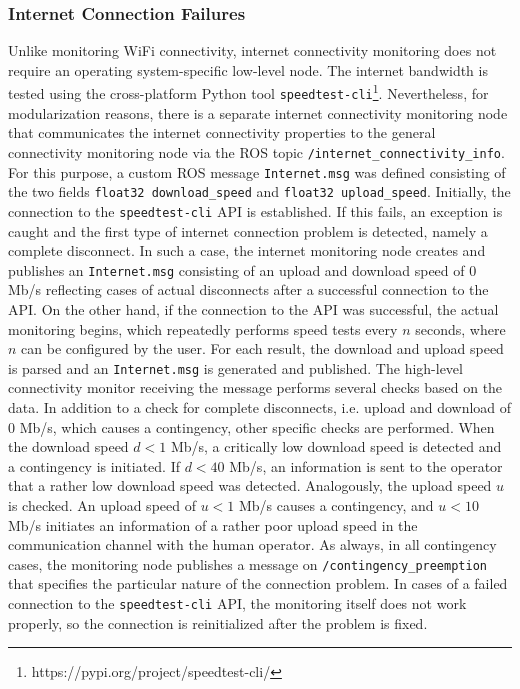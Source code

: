 \documentclass[english, master, utf8]{base/thesis_KBS}
\newcommand{\code}[1]{\colorbox{light-gray}{\texttt{#1}}}
\begin{document}
\subsubsection{Internet Connection Failures}
\label{sec:sim_and_mon_internet_connection_problems}

Unlike monitoring WiFi connectivity, internet connectivity monitoring does not require an operating system-specific low-level node. The internet bandwidth is tested using the
cross-platform Python tool \code{speedtest-cli}\footnote{https://pypi.org/project/speedtest-cli/}. Nevertheless, for modularization reasons, there is a separate internet
connectivity monitoring node that communicates the internet connectivity properties to the general connectivity monitoring node via the ROS topic \code{/internet\_connectivity\_info}.
For this purpose, a custom ROS message \code{Internet.msg} was defined consisting of the two fields \code{float32 download\_speed} and \code{float32 upload\_speed}. Initially,
the connection to the \code{speedtest-cli} API is established. If this fails, an exception is caught and the first type of internet connection problem is detected, namely a
complete disconnect. In such a case, the internet monitoring node creates and publishes an \code{Internet.msg} consisting of an upload and download speed of $0$ Mb/s
reflecting cases of actual disconnects after a successful connection to the API. On the other hand, if the connection to the API was successful, the actual monitoring begins, which
repeatedly performs speed tests every $n$ seconds, where $n$ can be configured by the user. For each result, the download and upload speed is parsed and an \code{Internet.msg} is
generated and published. The high-level connectivity monitor receiving the message performs several checks based on the data. In addition to a check for complete disconnects,
i.e. upload and download of $0$ Mb/s, which causes a contingency, other specific checks are performed. When the download speed $d < 1$ Mb/s, a critically low download speed is 
detected and a contingency is initiated. If $d < 40$ Mb/s, an information is sent to the operator that a rather low download speed was detected. Analogously, the upload speed $u$ is
checked. An upload speed of $u < 1$ Mb/s causes a contingency, and $u < 10$ Mb/s initiates an information of a rather poor upload speed in the communication channel with the human
operator. As always, in all contingency cases, the monitoring node publishes a message on \code{/contingency\_preemption} that specifies the particular nature of the connection
problem. In cases of a failed connection to the \code{speedtest-cli} API, the monitoring itself does not work properly, so the connection is reinitialized after the problem is fixed.\newline
\end{document}
